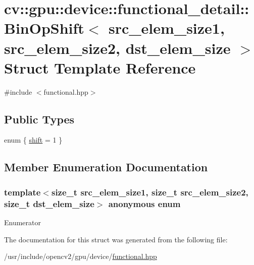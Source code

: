 \hypertarget{structcv_1_1gpu_1_1device_1_1functional__detail_1_1BinOpShift}{\section{cv\-:\-:gpu\-:\-:device\-:\-:functional\-\_\-detail\-:\-:Bin\-Op\-Shift$<$ src\-\_\-elem\-\_\-size1, src\-\_\-elem\-\_\-size2, dst\-\_\-elem\-\_\-size $>$ Struct Template Reference}
\label{structcv_1_1gpu_1_1device_1_1functional__detail_1_1BinOpShift}
}


{\ttfamily \#include $<$functional.\-hpp$>$}

\subsection*{Public Types}
\begin{DoxyCompactItemize}
\item 
enum \{ \hyperlink{structcv_1_1gpu_1_1device_1_1functional__detail_1_1BinOpShift_af9fecdc00b07b6ae810b939e09264b27a25a09aa91195dc3249364b140b6d79a5}{shift} = 1
 \}
\end{DoxyCompactItemize}


\subsection{Member Enumeration Documentation}
\hypertarget{structcv_1_1gpu_1_1device_1_1functional__detail_1_1BinOpShift_af9fecdc00b07b6ae810b939e09264b27}{\subsubsection[{anonymous enum}]{\setlength{\rightskip}{0pt plus 5cm}template$<$size\-\_\-t src\-\_\-elem\-\_\-size1, size\-\_\-t src\-\_\-elem\-\_\-size2, size\-\_\-t dst\-\_\-elem\-\_\-size$>$ anonymous enum}}\label{structcv_1_1gpu_1_1device_1_1functional__detail_1_1BinOpShift_af9fecdc00b07b6ae810b939e09264b27}
\begin{Desc}
\item[Enumerator]\par
\begin{description}
\item[{\em 
\hypertarget{structcv_1_1gpu_1_1device_1_1functional__detail_1_1BinOpShift_af9fecdc00b07b6ae810b939e09264b27a25a09aa91195dc3249364b140b6d79a5}{shift}\label{structcv_1_1gpu_1_1device_1_1functional__detail_1_1BinOpShift_af9fecdc00b07b6ae810b939e09264b27a25a09aa91195dc3249364b140b6d79a5}
}]\end{description}
\end{Desc}


The documentation for this struct was generated from the following file\-:\begin{DoxyCompactItemize}
\item 
/usr/include/opencv2/gpu/device/\hyperlink{functional_8hpp}{functional.\-hpp}\end{DoxyCompactItemize}
